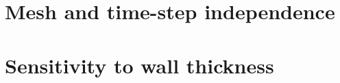 \section{Mesh and time-step independence}\label{app:independence}

\section{Sensitivity to wall thickness}\label{app:thickness}
